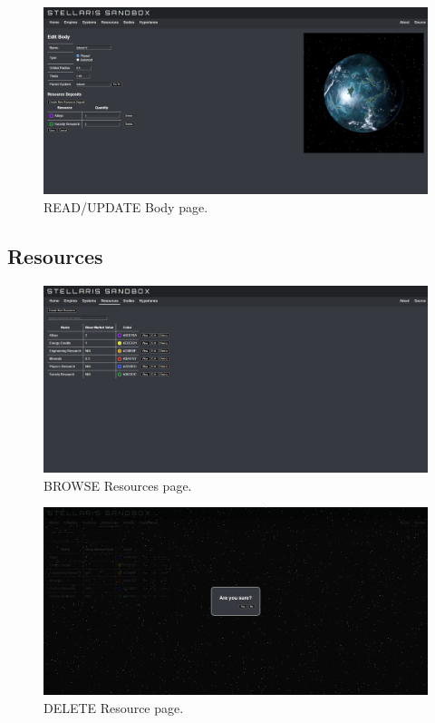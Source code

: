 \documentclass[12pt]{article}
\let\Oldsubsection\subsection
\renewcommand{\subsection}{\FloatBarrier\Oldsubsection}
\begin{document}
\begin{figure}[!ht]
  \caption{READ/UPDATE Body page.}
  \includegraphics[width=\textwidth]{screenshots/bodies/bodies_read_update.png}
\end{figure}

\newpage
\subsection{Resources}

\begin{figure}[!ht]
  \caption{BROWSE Resources page.}
  \includegraphics[width=\textwidth]{screenshots/resources/resources_browse.png}
\end{figure}

\begin{figure}[!ht]
  \caption{DELETE Resource page.}
  \includegraphics[width=\textwidth]{screenshots/resources/resources_delete.png}
\end{figure}
\end{document}
